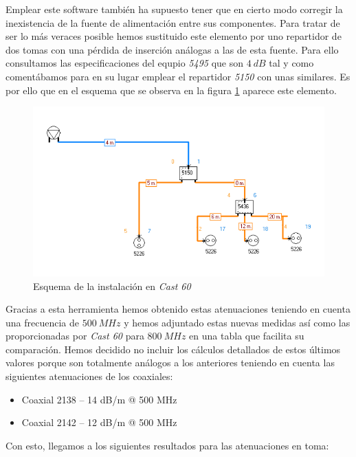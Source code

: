 \documentclass{article}[12 pt]
\begin{document}
			Emplear este software también ha supuesto tener que en cierto modo corregir la inexistencia de la fuente de alimentación entre sus componentes. Para tratar de ser lo más veraces posible hemos sustituido este elemento por uno repartidor de dos tomas con una pérdida de inserción análogas a las de esta fuente. Para ello consultamos las especificaciones del equpio \textit{5495} que son $4\ dB$ tal y como comentábamos para en su lugar emplear el repartidor \textit{5150} con unas similares. Es por ello que en el esquema que se observa en la figura \ref{f:cast60} aparece este elemento.\\

			\begin{figure}
				\centering
				\includegraphics[scale=0.8]{esquema_mitad.png}
				\caption{Esquema de la instalación en \textit{Cast 60}}
				\label{f:cast60}
			\end{figure}

			Gracias a esta herramienta hemos obtenido estas atenuaciones teniendo en cuenta una frecuencia de $500\ MHz$ y hemos adjuntado estas nuevas medidas así como las proporcionadas por \textit{Cast 60} para $800\ MHz$ en una tabla que facilita su comparación. Hemos decidido no incluir los cálculos detallados de estos últimos valores porque son totalmente análogos a los anteriores teniendo en cuenta las siguientes atenuaciones de los coaxiales:

			\begin{itemize}
				\item Coaxial 2138 -- 14 dB/m @ 500 MHz
				\item Coaxial 2142 -- 12 dB/m @ 500 MHz
			\end{itemize}

			Con esto, llegamos a los siguientes resultados para las atenuaciones en toma:
\end{document}

